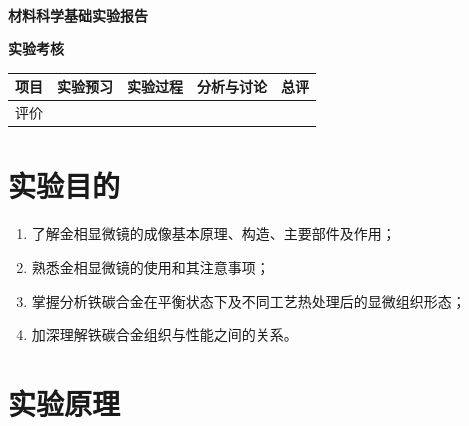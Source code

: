 \documentclass[a4paper,utf8]{article}
\begin{document}
\begin{center}
    {\mbox{}\\[7em]\bfseries\songti%
    材料科学基础实验报告}\\[34mm]
    {\bfseries\songti
    实验考核\\[3mm]
    \extrarowheight=3mm
    \begin{tabularx}{150mm}{|X|X|X|X|X|}\hline
        \hfil 项目 \hfil  & \hfil 实验预习 \hfil & \hfil 实验过程 \hfil & \hfil 分析与讨论 \hfil & \hfil 总评 \hfil \\[3mm] \hline
        \hfil 评价 \hfil &  &  &  &  \\[3mm] \hline
    \end{tabularx}
    }
\end{center}\newpage
\section{实验目的}
\begin{enumerate}
    \item 了解金相显微镜的成像基本原理、构造、主要部件及作用；
    \item 熟悉金相显微镜的使用和其注意事项；
    \item 掌握分析铁碳合金在平衡状态下及不同工艺热处理后的显微组织形态；
    \item 加深理解铁碳合金组织与性能之间的关系。
\end{enumerate}

\section{实验原理}%
\end{document}
